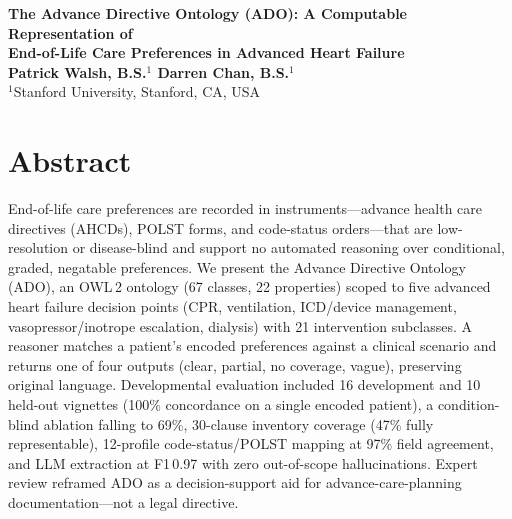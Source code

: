 \documentclass[10pt]{article}
\begin{document}
\begin{center}
{\large\bfseries The Advance Directive Ontology (ADO): A Computable Representation of\\
End-of-Life Care Preferences in Advanced Heart Failure}\\[1em]
{\bfseries Patrick Walsh, B.S.$^{1}$ \quad Darren Chan, B.S.$^{1}$}\\[0.4em]
{$^{1}$Stanford University, Stanford, CA, USA}
\end{center}

\vspace{0.6em}

\section{Abstract}
\begin{itshape}
End-of-life care preferences are recorded in instruments---advance health care directives (AHCDs), POLST forms, and code-status orders---that are low-resolution or disease-blind and support no automated reasoning over conditional, graded, negatable preferences. We present the Advance Directive Ontology (ADO), an OWL\,2 ontology (67 classes, 22 properties) scoped to five advanced heart failure decision points (CPR, ventilation, ICD/device management, vasopressor/inotrope escalation, dialysis) with 21 intervention subclasses. A reasoner matches a patient's encoded preferences against a clinical scenario and returns one of four outputs (clear, partial, no coverage, vague), preserving original language. Developmental evaluation included 16 development and 10 held-out vignettes (100\% concordance on a single encoded patient), a condition-blind ablation falling to 69\%, 30-clause inventory coverage (47\% fully representable), 12-profile code-status/POLST mapping at 97\% field agreement, and LLM extraction at F1\,0.97 with zero out-of-scope hallucinations. Expert review reframed ADO as a decision-support aid for advance-care-planning documentation---not a legal directive.
\end{itshape}
\end{document}
